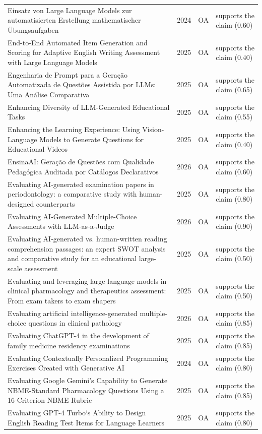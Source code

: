 \begin{longtable}{@{}%
  >{\raggedright\arraybackslash}p{}c%
  >{\raggedright\arraybackslash}p{}%
  >{\raggedright\arraybackslash}p{}@{}}
Einsatz von Large Language Models zur automatisierten Erstellung mathematischer Übungsaufgaben & 2024 & OA & supports the claim (0.60) \\
End-to-End Automated Item Generation and Scoring for Adaptive English Writing Assessment with Large Language Models & 2025 & OA & supports the claim (0.40) \\
Engenharia de Prompt para a Geração Automatizada de Questões Assistida por LLMs: Uma Análise Comparativa & 2025 & OA & supports the claim (0.65) \\
Enhancing Diversity of LLM-Generated Educational Tasks & 2025 & OA & supports the claim (0.55) \\
Enhancing the Learning Experience: Using Vision-Language Models to Generate Questions for Educational Videos & 2025 & OA & supports the claim (0.40) \\
EnsinaAI: Geração de Questões com Qualidade Pedagógica Auditada por Catálogos Declarativos & 2026 & OA & supports the claim (0.60) \\
Evaluating AI-generated examination papers in periodontology: a comparative study with human-designed counterparts & 2025 & OA & supports the claim (0.80) \\
Evaluating AI-Generated Multiple-Choice Assessments with LLM-as-a-Judge & 2026 & OA & supports the claim (0.90) \\
Evaluating AI-generated vs. human-written reading comprehension passages: an expert SWOT analysis and comparative study for an educational large-scale assessment & 2025 & OA & supports the claim (0.50) \\
Evaluating and leveraging large language models in clinical pharmacology and therapeutics assessment: From exam takers to exam shapers & 2025 & OA & supports the claim (0.50) \\
Evaluating artificial intelligence-generated multiple-choice questions in clinical pathology & 2026 & OA & supports the claim (0.85) \\
Evaluating ChatGPT-4 in the development of family medicine residency examinations & 2025 & OA & supports the claim (0.85) \\
Evaluating Contextually Personalized Programming Exercises Created with Generative AI & 2024 & OA & supports the claim (0.80) \\
Evaluating Google Gemini's Capability to Generate NBME-Standard Pharmacology Questions Using a 16-Criterion NBME Rubric & 2025 & OA & supports the claim (0.85) \\
Evaluating GPT-4 Turbo`s Ability to Design English Reading Test Items for Language Learners & 2025 & OA & supports the claim (0.80) \\

\end{longtable}
